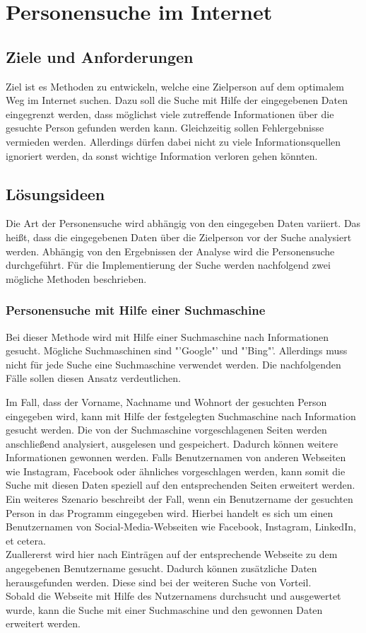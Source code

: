 \section{Personensuche im Internet}
	\subsection{Ziele und Anforderungen}
	Ziel ist es Methoden zu entwickeln, welche eine Zielperson auf dem optimalem Weg im Internet suchen. Dazu soll die Suche mit Hilfe der eingegebenen Daten eingegrenzt werden, dass möglichst viele zutreffende Informationen über die gesuchte Person gefunden werden kann. Gleichzeitig sollen Fehlergebnisse vermieden werden. Allerdings dürfen dabei nicht zu viele Informationsquellen ignoriert werden, da sonst wichtige Information verloren gehen könnten.
	
	\subsection{Lösungsideen}
	\label{sec:Suche nach Information}
	Die Art der Personensuche wird abhängig von den eingegeben Daten variiert. Das heißt, dass die eingegebenen Daten über die Zielperson vor der Suche analysiert werden. Abhängig von den Ergebnissen der Analyse wird die Personensuche durchgeführt. Für die Implementierung der Suche werden nachfolgend zwei mögliche Methoden beschrieben.
	
		\subsubsection{Personensuche mit Hilfe einer Suchmaschine}
		\label{subsubsec:PersonensucheMitHilfevonSuchmaschine}
		Bei dieser Methode wird mit Hilfe einer Suchmaschine nach Informationen gesucht. Mögliche Suchmaschinen sind "'Google"' und "'Bing"'. Allerdings muss nicht für jede Suche eine Suchmaschine verwendet werden. Die nachfolgenden Fälle sollen diesen Ansatz verdeutlichen.
		
		Im Fall, dass der Vorname, Nachname und Wohnort der gesuchten Person eingegeben wird, kann mit Hilfe der festgelegten Suchmaschine nach Information gesucht werden. Die von der Suchmaschine vorgeschlagenen Seiten werden anschließend analysiert, ausgelesen und gespeichert. Dadurch können weitere Informationen gewonnen werden. Falls Benutzernamen von anderen Webseiten wie Instagram, Facebook oder ähnliches vorgeschlagen werden, kann somit die Suche mit diesen Daten speziell auf den entsprechenden Seiten erweitert werden.\\
		Ein weiteres Szenario beschreibt der Fall, wenn ein Benutzername der gesuchten Person in das Programm eingegeben wird. Hierbei handelt es sich um einen Benutzernamen von Social-Media-Webseiten wie Facebook, Instagram, LinkedIn, et cetera. \\
		Zuallererst wird hier nach Einträgen auf der entsprechende Webseite zu dem angegebenen Benutzername gesucht. Dadurch können zusätzliche Daten herausgefunden werden. Diese sind bei der weiteren Suche von Vorteil.\\
		Sobald die Webseite mit Hilfe des Nutzernamens durchsucht und ausgewertet wurde, kann die Suche mit einer Suchmaschine und den gewonnen Daten erweitert werden.
		
